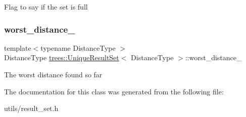 Flag to say if the set is full \mbox{\label{classtrees_1_1_unique_result_set_acdfe562ad6f99ae5f68b7e8af3d68171}} 
\subsubsection{\texorpdfstring{worst\+\_\+distance\+\_\+}{worst\_distance\_}}
{\footnotesize\ttfamily template$<$typename Distance\+Type $>$ \\
Distance\+Type \hyperlink{classtrees_1_1_unique_result_set}{trees\+::\+Unique\+Result\+Set}$<$ Distance\+Type $>$\+::worst\+\_\+distance\+\_\+\hspace{0.3cm}{\ttfamily [protected]}}

The worst distance found so far 

The documentation for this class was generated from the following file\+:\begin{DoxyCompactItemize}
\item 
utils/result\+\_\+set.\+h\end{DoxyCompactItemize}
